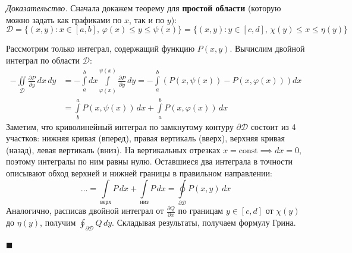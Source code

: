 \documentclass[12pt,a4paper]{article}
\newenvironment{Proof}[1][Доказательство]{\vspace{0.5em}\noindent\textit{#1.}\hspace{0.5em}\ignorespaces}{\hfill$\blacksquare$\vspace{1em}}
\begin{document}
\begin{Proof}
Сначала докажем теорему для \textbf{простой области} (которую можно задать как графиками по $x$, так и по $y$):
$$ \mathscr{D} = \{ (x,y) : x \in [a,b], \, \varphi(x) \le y \le \psi(x) \} = \{ (x,y) : y \in [c,d], \, \chi(y) \le x \le \eta(y) \} $$

\begin{center}
\end{center}

Рассмотрим только интеграл, содержащий функцию $P(x,y)$. Вычислим двойной интеграл по области $\mathscr{D}$:
\begin{align*}
    -\iint\limits_{\mathscr{D}} \frac{\partial P}{\partial y} \, dx \, dy &= - \int\limits_a^b dx \int\limits_{\varphi(x)}^{\psi(x)} \frac{\partial P}{\partial y} \, dy = - \int\limits_a^b \left( P(x, \psi(x)) - P(x, \varphi(x)) \right) dx \\
    &= \int\limits_b^a P(x, \psi(x)) \, dx + \int\limits_a^b P(x, \varphi(x)) \, dx
\end{align*}
Заметим, что криволинейный интеграл по замкнутому контуру $\partial\mathscr{D}$ состоит из 4 участков: нижняя кривая (вперед), правая вертикаль (вверх), верхняя кривая (назад), левая вертикаль (вниз). 
На вертикальных отрезках $x = \text{const} \implies dx = 0$, поэтому интегралы по ним равны нулю.
Оставшиеся два интеграла в точности описывают обход верхней и нижней границы в правильном направлении:
$$ \dots = \int\limits_{\text{верх}} P \, dx + \int\limits_{\text{низ}} P \, dx = \oint\limits_{\partial\mathscr{D}} P(x,y) \, dx $$
Аналогично, расписав двойной интеграл от $\frac{\partial Q}{\partial x}$ по границам $y \in [c, d]$ от $\chi(y)$ до $\eta(y)$, получим $\oint_{\partial\mathscr{D}} Q \, dy$. Складывая результаты, получаем формулу Грина.


\end{Proof}
\end{document}
